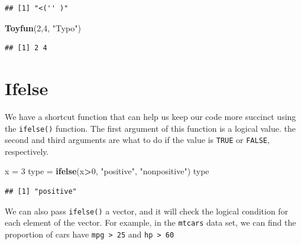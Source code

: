 \documentclass[
]{book}
\newenvironment{Shaded}{\begin{snugshade}}{\end{snugshade}}
\newcommand{\DecValTok}[1]{\textcolor[rgb]{0.00,0.00,0.81}{#1}}
\newcommand{\KeywordTok}[1]{\textcolor[rgb]{0.13,0.29,0.53}{\textbf{#1}}}
\newcommand{\NormalTok}[1]{#1}
\newcommand{\OperatorTok}[1]{\textcolor[rgb]{0.81,0.36,0.00}{\textbf{#1}}}
\newcommand{\OtherTok}[1]{\textcolor[rgb]{0.56,0.35,0.01}{#1}}
\newcommand{\StringTok}[1]{\textcolor[rgb]{0.31,0.60,0.02}{#1}}
\begin{document}
\begin{verbatim}
## [1] "<('' )"
\end{verbatim}

\begin{Shaded}
\begin{Highlighting}[]
\KeywordTok{Toyfun}\NormalTok{(}\DecValTok{2}\NormalTok{,}\DecValTok{4}\NormalTok{, }\StringTok{"Typo"}\NormalTok{)}
\end{Highlighting}
\end{Shaded}

\begin{verbatim}
## [1] 2 4
\end{verbatim}

\hypertarget{ifelse}{%
\section{Ifelse}\label{ifelse}}

We have a shortcut function that can help us keep our code more succinct using the \texttt{ifelse()} function. The first argument of this function is a logical value. the second and third arguments are what to do if the value is \texttt{TRUE} or \texttt{FALSE}, respectively.

\begin{Shaded}
\begin{Highlighting}[]
\NormalTok{x =}\StringTok{ }\DecValTok{3}
\NormalTok{type =}\StringTok{ }\KeywordTok{ifelse}\NormalTok{(x}\OperatorTok{>}\DecValTok{0}\NormalTok{,  }\StringTok{"positive"}\NormalTok{, }\StringTok{"nonpositive"}\NormalTok{)}
\NormalTok{type }
\end{Highlighting}
\end{Shaded}

\begin{verbatim}
## [1] "positive"
\end{verbatim}

We can also pass \texttt{ifelse()} a vector, and it will check the logical condition for each element of the vector. For example, in the \texttt{mtcars} data set, we can find the proportion of cars have \texttt{mpg\ \textgreater{}\ 25} and \texttt{hp\ \textgreater{}\ 60}

\begin{Shaded}
\end{Shaded}
\end{document}
